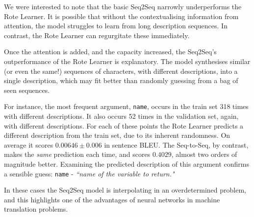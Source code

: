 We were interested to note that the basic Seq2Seq narrowly underperforms the Rote Learner. 
It is possible that without the contextualising information from attention, the model struggles to learn from long description sequences. In contrast, the Rote Learner can regurgitate these immediately. 

Once the attention is added, and the capacity increased, the Seq2Seq's outperformance of the Rote Learner is explanatory.
The model synthesises similar (or even the same!) sequences of characters, with different descriptions, into a single description, which may fit better than randomly guessing from a bag of seen sequences. 

For instance, the most frequent argument, \texttt{name}, occurs in the train set 318 times with different descriptions. 
It also occurs 52 times in the validation set, again, with different descriptions. 
For each of these points the Rote Learner predicts a different description from the train set, due to its inherent randomness. On average it scores $0.00646 \pm 0.006$ in sentence BLEU. The Seq-to-Seq, by contrast, makes the \textit{same} prediction each time, and scores $0.4029$, almost two orders of magnitude better. Examining the predicted description of this argument confirms a sensible guess: \texttt{name} - \textit{``name of the variable to return."} 

In these cases the Seq2Seq model is interpolating in an overdetermined problem, and this highlights one of the advantages of neural networks in machine translation problems. 

